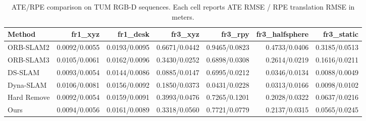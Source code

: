 \begin{table}[t]
\centering
\caption{ATE/RPE comparison on TUM RGB-D sequences. Each cell reports ATE RMSE / RPE translation RMSE in meters.}
\label{tab:tum_ate_rpe}
\begin{tabular}{lrrrrrr}
\toprule
Method & fr1\_xyz & fr1\_desk & fr3\_xyz & fr3\_rpy & fr3\_halfsphere & fr3\_static \\
\midrule
ORB-SLAM2 & 0.0092/0.0055 & 0.0193/0.0095 & 0.6671/0.0442 & 0.9465/0.0823 & 0.4733/0.0406 & 0.3185/0.0513 \\
ORB-SLAM3 & 0.0105/0.0061 & 0.0162/0.0096 & 0.3430/0.0252 & 0.6898/0.0308 & 0.2614/0.0219 & 0.1616/0.0211 \\
DS-SLAM & 0.0093/0.0054 & 0.0144/0.0086 & 0.0885/0.0147 & 0.6995/0.0212 & 0.0346/0.0134 & 0.0088/0.0049 \\
Dyna-SLAM & 0.0106/0.0081 & 0.0156/0.0092 & 0.1850/0.0373 & 0.0431/0.0228 & 0.0313/0.0166 & 0.0098/0.0102 \\
Hard Remove & 0.0092/0.0054 & 0.0159/0.0091 & 0.3993/0.0476 & 0.7265/0.1201 & 0.2028/0.0322 & 0.0637/0.0216 \\
Ours & 0.0094/0.0056 & 0.0161/0.0089 & 0.3318/0.0560 & 0.7721/0.0779 & 0.2137/0.0315 & 0.0565/0.0245 \\
\bottomrule
\end{tabular}
\end{table}
